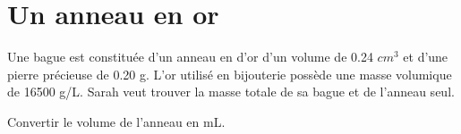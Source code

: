 \section{Un anneau en or}

Une bague est constituée d'un anneau en d'or d'un volume de \num{0.24} $cm^3$ et d'une pierre précieuse de \num{0.20}  g. 
L'or utilisé en bijouterie possède une masse volumique de \num{16500} g/L. 
Sarah veut trouver la masse totale de sa bague et de l'anneau seul.

\begin{questions}
	\question Convertir le volume de l'anneau en mL.
	\fillwithdottedlines{1.5cm}
	
	\question 
\end{questions}